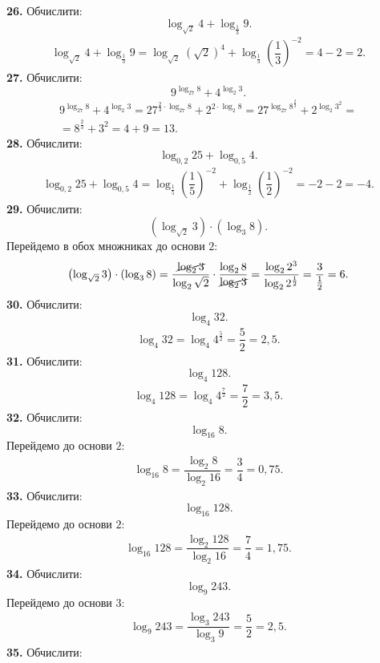 \textbf{26.} Обчислити:
$$
\log_{\sqrt{2}}4+\log_{\frac{1}{3}}9.
$$
\begin{gather*}
\log_{\sqrt{2}}4+\log_{\frac{1}{3}}9=
\log_{\sqrt{2}}\left(\sqrt{2}\right)^4+\log_{\frac{1}{3}}\left(\dfrac{1}{3}\right)^{-2}=
4-2=2.
\end{gather*}
\textbf{27.} Обчислити:
$$
9^{\log_{27}8}+4^{\log_{2}3}.
$$
\begin{multline*}
9^{\log_{27}8}+4^{\log_{2}3}=
27^{\frac{2}{3}\cdot\log_{27}8}+2^{2\cdot\log_{2}8}=
27^{\log_{27}8^{\frac{2}{3}}}+2^{\log_{2}3^2}=\\
=8^{\frac{2}{3}}+3^2=4+9=13.
\end{multline*}
\textbf{28.} Обчислити:
$$
\log_{0,2}25+\log_{0,5}4.
$$
\begin{gather*}
\log_{0,2}25+\log_{0,5}4=
\log_{\frac{1}{5}}\left(\dfrac{1}{5}\right)^{-2}+\log_{\frac{1}{2}}\left(\dfrac{1}{2}\right)^{-2}=
-2-2=-4.
\end{gather*}
\textbf{29.} Обчислити:
$$
\left(\log_{\sqrt{2}}3\right)\cdot\left(\log_{3}8\right).
$$
Перейдемо в обох множниках до основи $2$:
\begin{gather*}
\left(\log_{\sqrt{2}}3\right)\cdot\left(\log_{3}8\right)=
\dfrac{\cancel{\log_{2}3}}{\log_{2}\sqrt{2}}\cdot\dfrac{\log_{2}8}{\cancel{\log_{2}3}}=
\dfrac{\log_{2}2^3}{\log_{2}2^{\frac{1}{2}}}=
\dfrac{3}{\frac{1}{2}}=6.
\end{gather*}
\textbf{30.} Обчислити:
$$
\log_{4}32.
$$
\begin{gather*}
\log_{4}32=
\log_{4}4^{\frac{5}{2}}=
\dfrac{5}{2}=2,5.
\end{gather*}
\textbf{31.} Обчислити:
$$
\log_{4}128.
$$
\begin{gather*}
\log_{4}128=
\log_{4}4^{\frac{7}{2}}=
\dfrac{7}{2}=3,5.
\end{gather*}
\textbf{32.} Обчислити:
$$
\log_{16}8.
$$
Перейдемо до основи $2$:
\begin{gather*}
\log_{16}8=
\dfrac{\log_{2}8}{\log_{2}16}=
\dfrac{3}{4}=0,75.
\end{gather*}
\textbf{33.} Обчислити:
$$
\log_{16}128.
$$
Перейдемо до основи $2$:
\begin{gather*}
\log_{16}128=
\dfrac{\log_{2}128}{\log_{2}16}=
\dfrac{7}{4}=1,75.
\end{gather*}
\textbf{34.} Обчислити:
$$
\log_{9}243.
$$
Перейдемо до основи $3$:
\begin{gather*}
\log_{9}243=
\dfrac{\log_{3}243}{\log_{3}9}=
\dfrac{5}{2}=2,5.
\end{gather*}
\textbf{35.} Обчислити:
